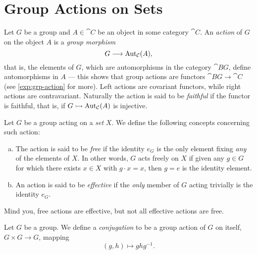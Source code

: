 \section{Group Actions on Sets}

\begin{definition}
\label{def:group-action}
Let \(G\) be a group and \(A \in \cat C\) be an object in some category
\(\cat C\). An \emph{action} of \(G\) on the object \(A\) is a \emph{group
  morphism}
\[
G \longrightarrow \operatorname{Aut}_{\mathcal C}(A),
\]
that is, the elements of \(G\), which are automorphisms in the category
\(\cat{B}G\), define automorphisms in \(A\) --- this shows that group actions
are functors \(\cat{B}G \to \cat C\) (see \cref{exp:grp-action} for more). Left
actions are covariant functors, while right actions are contravariant.
Naturally the action is said to be \emph{faithful} if the functor is faithful,
that is, if \(G \rightarrowtail \operatorname{Aut}_{\mathcal C}(A)\) is injective.
\end{definition}

\begin{definition}
\label{def:free-effective-action}
Let \(G\) be a group acting on a \emph{set} \(X\). We define the following
concepts concerning such action:
\begin{enumerate}[(a)]\setlength\itemsep{0em}
\item The action is said to be \emph{free} if the identity \(e_G\) is the only
  element fixing \emph{any} of the elements of \(X\). In other words, \(G\) acts
  freely on \(X\) if given any \(g \in G\) for which there exists \(x \in X\)
  with \(g \cdot x = x\), then \(g = e\) is the identity element.

\item An action is said to be \emph{effective} if the \emph{only} member of
  \(G\) acting trivially is the identity \(e_G\).
\end{enumerate}
\end{definition}

\begin{remark}
\label{rem:free-versus-effective-actions}
Mind you, free actions are effective, but not all effective actions are free.
\end{remark}

\begin{definition}[Conjugation]
\label{def:group-conjugation-action}
Let \(G\) be a group. We define a \emph{conjugation} to be a group action of
\(G\) on itself, \(G \times G \to G\), mapping
\[
(g, h) \longmapsto g h g^{-1}.
\]
\end{definition}

